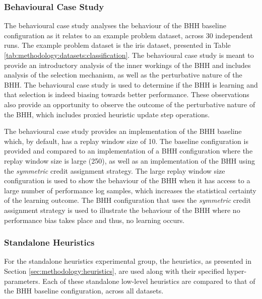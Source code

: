 \subsubsection{Behavioural Case Study}
\label{sec:methodology:experiments:case_study}

The behavioural case study analyses the behaviour of the \acs{BHH} baseline configuration as it relates to an example problem dataset, across 30 independent runs. The example problem dataset is the iris dataset, presented in Table \ref{tab:methodology:datasets:classification}. The behavioural case study is meant to provide an introductory analysis of the inner workings of the \acs{BHH} and includes analysis of the selection mechanism, as well as the perturbative nature of the \acs{BHH}. The behavioural case study is used to determine if the \acs{BHH} is learning and that selection is indeed biasing towards better performance. These observations also provide an opportunity to observe the outcome of the perturbative nature of the \acs{BHH}, which includes proxied heuristic update step operations.

The behavioural case study provides an implementation of the \acs{BHH} baseline which, by default, has a replay window size of 10. The baseline configuration is provided and compared to an implementation of a \acs{BHH} configuration where the replay window size is large (250), as well as an implementation of the \acs{BHH} using the \textit{symmetric} credit assignment strategy. The large replay window size configuration is used to show the behaviour of the \acs{BHH} when it has access to a large number of performance log samples, which increases the statistical certainty of the learning outcome. The \acs{BHH} configuration that uses the \textit{symmetric} credit assignment strategy is used to illustrate the behaviour of the \acs{BHH} where no performance bias takes place and thus, no learning occurs.

\subsubsection{Standalone Heuristics}
\label{sec:methodology:experiments:standalone_optimisers}

For the standalone heuristics experimental group, the heuristics, as presented in Section \ref{sec:methodology:heuristics}, are used along with their specified hyper-parameters. Each of these standalone low-level heuristics are compared to that of the \acs{BHH} baseline configuration, across all datasets.


